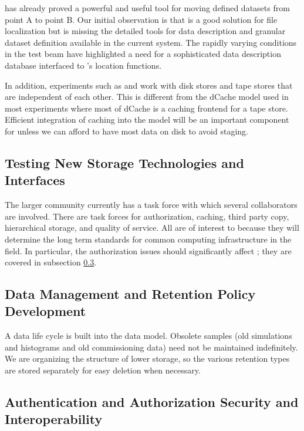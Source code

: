  has already proved a powerful and useful tool for moving defined datasets from point A to point B.  Our initial observation is that  is a good solution for file localization but is missing the detailed tools for data description and granular dataset definition available in the current  system.  The rapidly varying conditions in the test beam have highlighted a need for a sophisticated data description database interfaced to 's location functions. 

In addition,    experiments such as  and  work with disk stores and tape stores that are independent of each other.  This is different from the dCache model used in most  experiments where most of dCache is a caching frontend for a tape store.  Efficient integration of caching into the  model will be an important component for  unless  we can afford to have most data on disk to avoid staging.

\subsection{Testing New Storage Technologies and Interfaces}

The larger  community\cite{Berzano:2018xaa} currently has a  task force
 with which several  collaborators are involved. There are task forces for authorization, caching, third party copy, hierarchical storage, and quality of service. All are of interest to  because they will determine the long term standards for common computing infrastructure in the field. 
In particular, the authorization issues should significantly affect ; they are covered in subsection \ref{ch-comp-auth}.


\subsection{Data Management and Retention Policy Development}



A data life cycle is built into the  data model.  Obsolete samples (old simulations and histograms and old commissioning data) need not be maintained indefinitely.  
We are organizing the structure of lower storage, so the various retention types are stored separately for easy deletion when necessary.  

\subsection{Authentication and Authorization Security and Interoperability}\label{ch-comp-auth}

